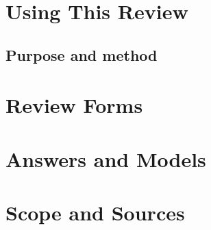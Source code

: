 \begingroup
\sloppy
{}
\setlength{\parskip}{0pt}
\tableofcontents
\endgroup
\clearpage
{}

\part{Using This Review}
\chapter{Purpose and method}


\RenderIncludedLatinIfAny

\clearpage
\part{Review Forms}
\solutionsfalse
\SelectAssessments{\AssessmentSelection}


\clearpage
\part{Answers and Models}

\solutionstrue
\SelectAssessments{\AssessmentSelection}

\solutionsfalse

\clearpage
\part{Scope and Sources}



{\footnotesize
}


